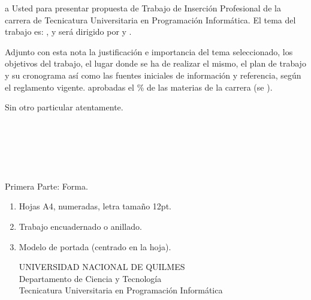  a Usted para presentar 
propuesta de Trabajo de Inserción Profesional de la carrera de Tecnicatura
Universitaria en Programación Informática. El tema del trabajo es: , y será dirigido por  y .

Adjunto con esta nota la justificación e importancia del tema
seleccionado, los objetivos del trabajo, el lugar donde se ha de realizar el
mismo, el plan de trabajo y su cronograma así como las fuentes iniciales de
información y referencia, según el reglamento vigente. 
aprobadas el \%  de las materias de la carrera (se
).

Sin otro particular  atentamente.\\ \\
\\
\\
\\
\\

\newpage
{}

Primera Parte: Forma.
\begin{enumerate}
\item Hojas A4, numeradas, letra tamaño 12pt.
\item Trabajo encuadernado o anillado.
\item Modelo de portada (centrado en la hoja).
\begin{center}
UNIVERSIDAD NACIONAL DE QUILMES\\
Departamento de Ciencia y Tecnología\\
Tecnicatura Universitaria en Programación Informática\\

\\
\\
\\
\\
\end{center}
\end{enumerate}

